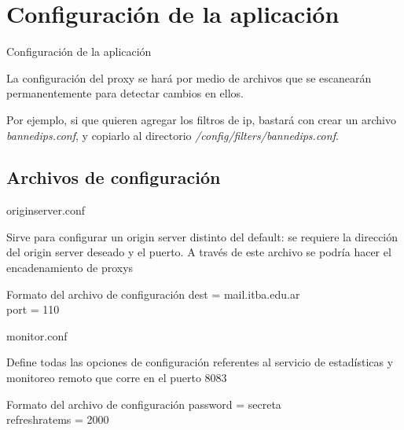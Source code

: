 \documentclass{beamer}
\begin{document}
\section{Configuración de la aplicación}
\begin{frame}{Configuración de la aplicación}

\par La configuración del proxy se hará por medio de archivos que se escanearán permanentemente para detectar cambios en ellos.\\[1cm]
\par Por ejemplo, si que quieren agregar los filtros de ip, bastará con crear un archivo \textit{bannedips.conf}, y copiarlo al directorio \textit{/config/filters/bannedips.conf}.

\end{frame}

\subsection{Archivos de configuración}

\begin{frame}{origin\textunderscore server.conf}

\par Sirve para configurar un origin server distinto del default: se requiere la dirección del origin server deseado y el puerto. A través de este archivo se podría hacer el encadenamiento de proxys\\[0.5cm]

\begin{block}{Formato del archivo de configuración}
dest = mail.itba.edu.ar\\
port = 110\\
\end{block}


\end{frame}

\begin{frame}{monitor.conf}

\par Define todas las opciones de configuración referentes al servicio de estadísticas y monitoreo remoto que corre en el puerto 8083\\[0.5cm]

\begin{block}{Formato del archivo de configuración}
password = secreta\\
refresh\textunderscore rate\textunderscore ms = 2000

\end{block}

\end{frame}
\end{document}

